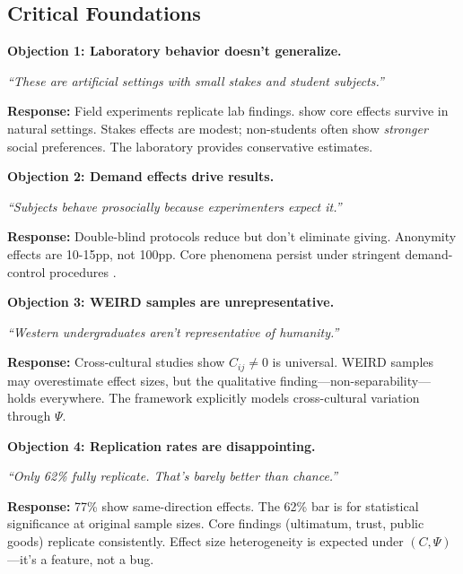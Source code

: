 
\subsection{Critical Foundations}
\label{sec:EV-foundations}

\begin{tcolorbox}[colback=red!5!white, colframe=red!75!black,
    title=\textbf{Critical Foundations: Objections and Responses}]

\textbf{Objection 1: Laboratory behavior doesn't generalize.}

\textit{``These are artificial settings with small stakes and student subjects.''}

\textbf{Response:} Field experiments replicate lab findings. \citet{levittlist2007interpretation}
show core effects survive in natural settings. Stakes effects are modest;
non-students often show \textit{stronger} social preferences. The laboratory
provides conservative estimates.

\medskip

\textbf{Objection 2: Demand effects drive results.}

\textit{``Subjects behave prosocially because experimenters expect it.''}

\textbf{Response:} Double-blind protocols reduce but don't eliminate giving.
Anonymity effects are 10-15pp, not 100pp. Core phenomena persist under
stringent demand-control procedures \citep{zizzo2010}.

\medskip

\textbf{Objection 3: WEIRD samples are unrepresentative.}

\textit{``Western undergraduates aren't representative of humanity.''}

\textbf{Response:} Cross-cultural studies \citep{henrich2000} show $C_{ij} \neq 0$
is universal. WEIRD samples may overestimate effect sizes, but the qualitative
finding---non-separability---holds everywhere. The framework explicitly
models cross-cultural variation through $\Psi$.

\medskip

\textbf{Objection 4: Replication rates are disappointing.}

\textit{``Only 62\% fully replicate. That's barely better than chance.''}

\textbf{Response:} 77\% show same-direction effects. The 62\% bar is for
statistical significance at original sample sizes. Core findings (ultimatum,
trust, public goods) replicate consistently. Effect size heterogeneity
is expected under $(C, \Psi)$---it's a feature, not a bug.

\end{tcolorbox}

